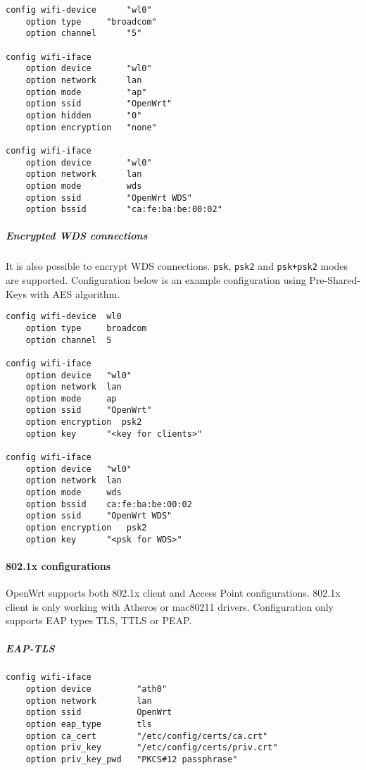 \begin{Verbatim}
config wifi-device      "wl0"
    option type		"broadcom"
    option channel      "5"

config wifi-iface
    option device       "wl0"
    option network  	lan
    option mode         "ap"
    option ssid         "OpenWrt"
    option hidden       "0"
    option encryption   "none"

config wifi-iface
    option device       "wl0"
    option network      lan
    option mode         wds
    option ssid         "OpenWrt WDS"
    option bssid        "ca:fe:ba:be:00:02"
\end{Verbatim}

\subparagraph{Encrypted WDS connections}

It is also possible to encrypt WDS connections. \texttt{psk}, \texttt{psk2} and
\texttt{psk+psk2} modes are supported. Configuration below is an example
configuration using Pre-Shared-Keys with AES algorithm.

\begin{Verbatim}
config wifi-device  wl0
    option type     broadcom
    option channel  5

config wifi-iface
    option device   "wl0"
    option network  lan
    option mode     ap
    option ssid     "OpenWrt"
    option encryption  psk2
    option key      "<key for clients>"

config wifi-iface
    option device   "wl0"
    option network  lan
    option mode     wds
    option bssid    ca:fe:ba:be:00:02
    option ssid     "OpenWrt WDS"
    option encryption	psk2
    option key      "<psk for WDS>"
\end{Verbatim}

\paragraph{802.1x configurations}

OpenWrt supports both 802.1x client and Access Point
configurations. 802.1x client is only working with
Atheros or mac80211 drivers. Configuration only
supports EAP types TLS, TTLS or PEAP.

\subparagraph{EAP-TLS}

\begin{Verbatim}
config wifi-iface
    option device         "ath0"
    option network        lan
    option ssid           OpenWrt
    option eap_type       tls
    option ca_cert        "/etc/config/certs/ca.crt"
    option priv_key       "/etc/config/certs/priv.crt"
    option priv_key_pwd   "PKCS#12 passphrase"
\end{Verbatim}

